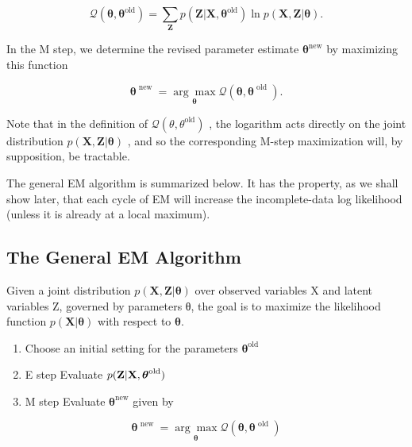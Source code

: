 \documentclass[
  10
]{article}
\begin{document}
\[
\mathcal {Q} (\boldsymbol {\theta}, \boldsymbol {\theta} ^ {\mathrm{old}}) = \sum_ {\mathbf {Z}} p (\mathbf {Z} | \mathbf {X}, \boldsymbol {\theta} ^ {\mathrm{old}}) \ln p (\mathbf {X}, \mathbf {Z} | \boldsymbol {\theta}).\tag{9.30}
\]

In the M step, we determine the revised parameter estimate
\(\pmb { \theta } ^ { \mathrm { n e w } }\) by maximizing this function

\[
\boldsymbol {\theta} ^ {\text { new }} = \underset {\boldsymbol {\theta}} {\arg \max} \mathcal {Q} (\boldsymbol {\theta}, \boldsymbol {\theta} ^ {\text { old }}).\tag{9.31}
\]

Note that in the definition of
\(\mathcal { Q } ( \theta , \theta ^ { \mathrm { o l d } } )\) , the
logarithm acts directly on the joint distribution
\(p ( \mathbf { X } , \mathbf { Z } | \boldsymbol { \theta } )\) , and
so the corresponding M-step maximization will, by supposition, be
tractable.

The general EM algorithm is summarized below. It has the property, as we
shall show later, that each cycle of EM will increase the
incomplete-data log likelihood (unless it is already at a local
maximum).

\subsection{The General EM Algorithm}\label{the-general-em-algorithm}

Given a joint distribution
\(p ( \mathbf { X } , \mathbf { Z } | \boldsymbol { \theta } )\) over
observed variables X and latent variables Z, governed by parameters θ,
the goal is to maximize the likelihood function
\(p ( \mathbf { X } | \pmb { \theta } )\) with respect to
\(\pmb { \theta } .\)

\begin{enumerate}
\def\labelenumi{\arabic{enumi}.}
\item
  Choose an initial setting for the parameters
  \(\pmb { \theta } ^ { \mathrm { o l d } }\)
\item
  E step Evaluate
  \(p ( { \bf Z } | { \bf X } , \boldsymbol { \theta } ^ { \mathrm { o l d } } )\)
\item
  M step Evaluate \(\pmb { \theta } ^ { \mathrm { n e w } }\) given by
\end{enumerate}

\[
\boldsymbol {\theta} ^ {\text { new }} = \underset {\boldsymbol {\theta}} {\arg \max} \mathcal {Q} (\boldsymbol {\theta}, \boldsymbol {\theta} ^ {\text { old }})\tag{9.32}
\]
\end{document}
